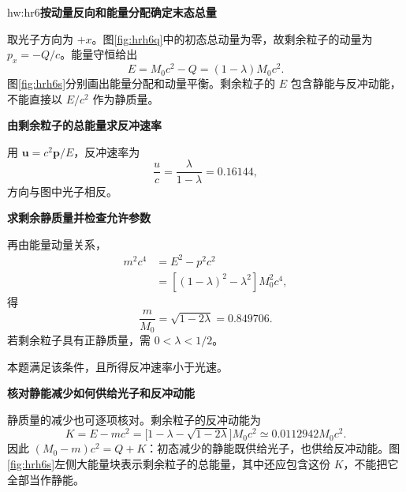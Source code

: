 \begin{drillsolution}{hw:hr6}\textbf{按动量反向和能量分配确定末态总量}\par\nobreak
取光子方向为 $+x$。图\ref{fig:hrh6q}中的初态总动量为零，故剩余粒子的动量为 $p_x=-Q/c$。能量守恒给出
\[
E=M_0c^2-Q=(1-\lambda)M_0c^2.
\]
图\ref{fig:hrh6s}分别画出能量分配和动量平衡。剩余粒子的 $E$ 包含静能与反冲动能，不能直接以 $E/c^2$ 作为静质量。



\par\medskip{}\noindent\textbf{由剩余粒子的总能量求反冲速率}\par\nobreak
用 $\bm u=c^2\bm p/E$，反冲速率为
\[
\boxed{\frac{u}{c}=\frac{\lambda}{1-\lambda}=0.16144},
\]
方向与图中光子相反。

\par\medskip{}\noindent\textbf{求剩余静质量并检查允许参数}\par\nobreak
再由能量动量关系，
\begin{align*}
m^2c^4&=E^2-p^2c^2\\
 &=[(1-\lambda)^2-\lambda^2]M_0^2c^4,
\end{align*}
得
\[
\boxed{\frac{m}{M_0}=\sqrt{1-2\lambda}=0.849706}.
\]
若剩余粒子具有正静质量，需 $0<\lambda<1/2$。

本题满足该条件，且所得反冲速率小于光速。


\par\medskip{}\noindent\textbf{核对静能减少如何供给光子和反冲动能}\par\nobreak
静质量的减少也可逐项核对。剩余粒子的反冲动能为
\[
K=E-mc^2=\bigl[1-\lambda-\sqrt{1-2\lambda}\bigr]M_0c^2
\simeq0.0112942M_0c^2.
\]
因此 $(M_0-m)c^2=Q+K$：初态减少的静能既供给光子，也供给反冲动能。图\ref{fig:hrh6s}左侧大能量块表示剩余粒子的总能量，其中还应包含这份 $K$，不能把它全部当作静能。

\end{drillsolution}
